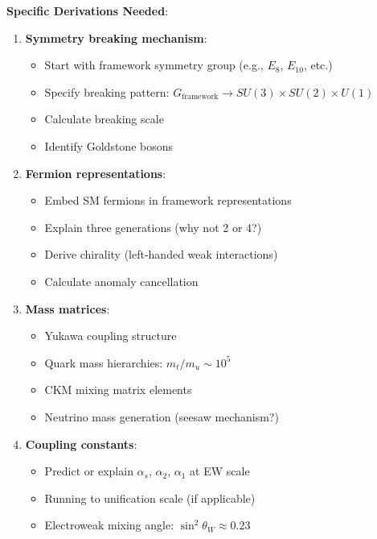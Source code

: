 \textbf{Specific Derivations Needed}:
\begin{enumerate}
    \item \textbf{Symmetry breaking mechanism}:
    \begin{itemize}
        \item Start with framework symmetry group (e.g., $E_8$, $E_{10}$, etc.)
        \item Specify breaking pattern: $G_{\text{framework}} \to SU(3) \times SU(2) \times U(1)$
        \item Calculate breaking scale
        \item Identify Goldstone bosons
    \end{itemize}

    \item \textbf{Fermion representations}:
    \begin{itemize}
        \item Embed SM fermions in framework representations
        \item Explain three generations (why not 2 or 4?)
        \item Derive chirality (left-handed weak interactions)
        \item Calculate anomaly cancellation
    \end{itemize}

    \item \textbf{Mass matrices}:
    \begin{itemize}
        \item Yukawa coupling structure
        \item Quark mass hierarchies: $m_t/m_u \sim 10^5$
        \item CKM mixing matrix elements
        \item Neutrino mass generation (seesaw mechanism?)
    \end{itemize}

    \item \textbf{Coupling constants}:
    \begin{itemize}
        \item Predict or explain $\alpha_s$, $\alpha_2$, $\alpha_1$ at EW scale
        \item Running to unification scale (if applicable)
        \item Electroweak mixing angle: $\sin^2\theta_W \approx 0.23$
    \end{itemize}
\end{enumerate}

